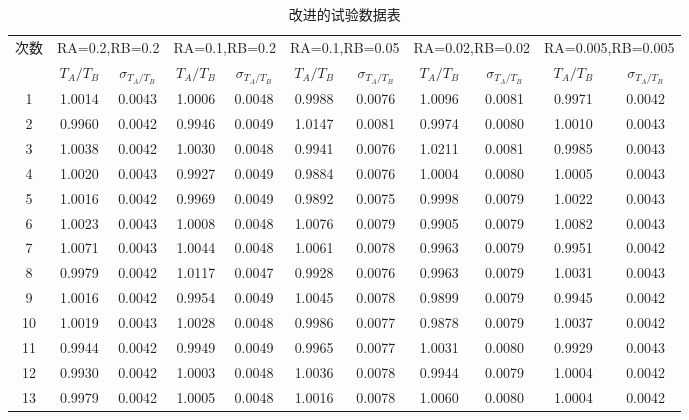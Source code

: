\documentclass[10pt, a4paper]{article}
\begin{document}
\begin{table}[H]
    \centering
    \caption{改进的试验数据表}
      \begin{tabular}{|c|c|c|c|c|c|c|c|c|c|c|}\hline
      \multirow{2}[0]{*}{次数} & \multicolumn{2}{|c}{RA=0.2,RB=0.2} & \multicolumn{2}{|c}{RA=0.1,RB=0.2} & \multicolumn{2}{|c}{RA=0.1,RB=0.05} & \multicolumn{2}{|c}{RA=0.02,RB=0.02} & \multicolumn{2}{|c|}{RA=0.005,RB=0.005} \\\cline{2-11}
            & $T_A/T_B$ & $\sigma_{T_A/T_B} $ & $T_A/T_B$ & $\sigma_{T_A/T_B} $& $T_A/T_B$ & $\sigma_{T_A/T_B} $ & $T_A/T_B$ & $\sigma_{T_A/T_B} $ & $T_A/T_B$ & $\sigma_{T_A/T_B} $ \\\hline
      1     & 1.0014 & 0.0043 & 1.0006 & 0.0048 & 0.9988 & 0.0076 & 1.0096 & 0.0081 & 0.9971 & 0.0042 \\\hline
      2     & 0.9960 & 0.0042 & 0.9946 & 0.0049 & 1.0147 & 0.0081 & 0.9974 & 0.0080 & 1.0010 & 0.0043 \\\hline
      3     & 1.0038 & 0.0042 & 1.0030 & 0.0048 & 0.9941 & 0.0076 & 1.0211 & 0.0081 & 0.9985 & 0.0043 \\\hline
      4     & 1.0020 & 0.0043 & 0.9927 & 0.0049 & 0.9884 & 0.0076 & 1.0004 & 0.0080 & 1.0005 & 0.0043 \\\hline
      5     & 1.0016 & 0.0042 & 0.9969 & 0.0049 & 0.9892 & 0.0075 & 0.9998 & 0.0079 & 1.0022 & 0.0043 \\\hline
      6     & 1.0023 & 0.0043 & 1.0008 & 0.0048 & 1.0076 & 0.0079 & 0.9905 & 0.0079 & 1.0082 & 0.0043 \\\hline
      7     & 1.0071 & 0.0043 & 1.0044 & 0.0048 & 1.0061 & 0.0078 & 0.9963 & 0.0079 & 0.9951 & 0.0042 \\\hline
      8     & 0.9979 & 0.0042 & 1.0117 & 0.0047 & 0.9928 & 0.0076 & 0.9963 & 0.0079 & 1.0031 & 0.0043 \\\hline
      9     & 1.0016 & 0.0042 & 0.9954 & 0.0049 & 1.0045 & 0.0078 & 0.9899 & 0.0079 & 0.9945 & 0.0042 \\\hline
      10    & 1.0019 & 0.0043 & 1.0028 & 0.0048 & 0.9986 & 0.0077 & 0.9878 & 0.0079 & 1.0037 & 0.0042 \\\hline
      11    & 0.9944 & 0.0042 & 0.9949 & 0.0049 & 0.9965 & 0.0077 & 1.0031 & 0.0080 & 0.9929 & 0.0043 \\\hline
      12    & 0.9930 & 0.0042 & 1.0003 & 0.0048 & 1.0036 & 0.0078 & 0.9944 & 0.0079 & 1.0004 & 0.0042 \\\hline
      13    & 0.9979 & 0.0042 & 1.0005 & 0.0048 & 1.0016 & 0.0078 & 1.0060 & 0.0080 & 1.0004 & 0.0042 \\\hline

\end{tabular}
\end{table}
\end{document}
